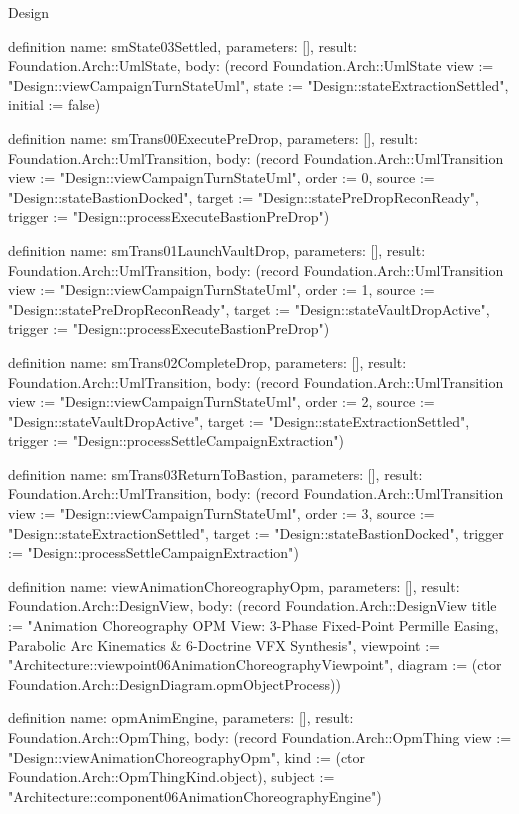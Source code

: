 \begin{lexlean}{Design}
\begin{semanticmodule}
definition{
  name: smState03Settled,
  parameters: [],
  result: Foundation.Arch::UmlState,
  body: (record Foundation.Arch::UmlState {view := "Design::viewCampaignTurnStateUml", state := "Design::stateExtractionSettled", initial := false})
}

definition{
  name: smTrans00ExecutePreDrop,
  parameters: [],
  result: Foundation.Arch::UmlTransition,
  body: (record Foundation.Arch::UmlTransition {view := "Design::viewCampaignTurnStateUml", order := 0, source := "Design::stateBastionDocked", target := "Design::statePreDropReconReady", trigger := "Design::processExecuteBastionPreDrop"})
}

definition{
  name: smTrans01LaunchVaultDrop,
  parameters: [],
  result: Foundation.Arch::UmlTransition,
  body: (record Foundation.Arch::UmlTransition {view := "Design::viewCampaignTurnStateUml", order := 1, source := "Design::statePreDropReconReady", target := "Design::stateVaultDropActive", trigger := "Design::processExecuteBastionPreDrop"})
}

definition{
  name: smTrans02CompleteDrop,
  parameters: [],
  result: Foundation.Arch::UmlTransition,
  body: (record Foundation.Arch::UmlTransition {view := "Design::viewCampaignTurnStateUml", order := 2, source := "Design::stateVaultDropActive", target := "Design::stateExtractionSettled", trigger := "Design::processSettleCampaignExtraction"})
}

definition{
  name: smTrans03ReturnToBastion,
  parameters: [],
  result: Foundation.Arch::UmlTransition,
  body: (record Foundation.Arch::UmlTransition {view := "Design::viewCampaignTurnStateUml", order := 3, source := "Design::stateExtractionSettled", target := "Design::stateBastionDocked", trigger := "Design::processSettleCampaignExtraction"})
}

definition{
  name: viewAnimationChoreographyOpm,
  parameters: [],
  result: Foundation.Arch::DesignView,
  body: (record Foundation.Arch::DesignView {title := "Animation Choreography OPM View: 3-Phase Fixed-Point Permille Easing, Parabolic Arc Kinematics & 6-Doctrine VFX Synthesis", viewpoint := "Architecture::viewpoint06AnimationChoreographyViewpoint", diagram := (ctor Foundation.Arch::DesignDiagram.opmObjectProcess)})
}

definition{
  name: opmAnimEngine,
  parameters: [],
  result: Foundation.Arch::OpmThing,
  body: (record Foundation.Arch::OpmThing {view := "Design::viewAnimationChoreographyOpm", kind := (ctor Foundation.Arch::OpmThingKind.object), subject := "Architecture::component06AnimationChoreographyEngine"})
}


\end{semanticmodule}
\end{lexlean}
